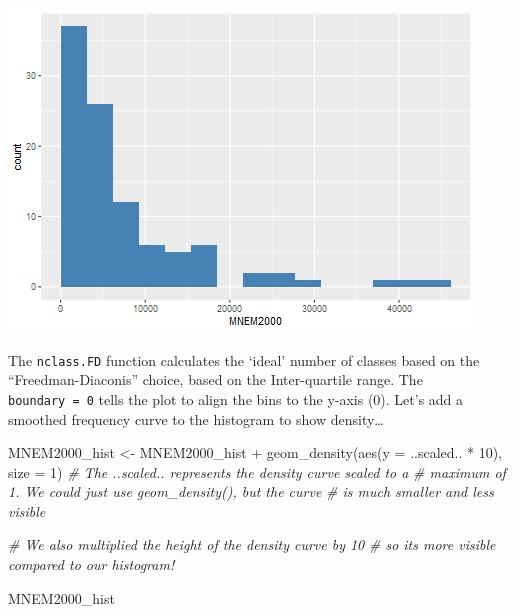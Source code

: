 \documentclass[
]{article}
\newenvironment{Shaded}{\begin{snugshade}}{\end{snugshade}}
\newcommand{\AttributeTok}[1]{\textcolor[rgb]{0.77,0.63,0.00}{#1}}
\newcommand{\CommentTok}[1]{\textcolor[rgb]{0.56,0.35,0.01}{\textit{#1}}}
\newcommand{\DecValTok}[1]{\textcolor[rgb]{0.00,0.00,0.81}{#1}}
\newcommand{\FunctionTok}[1]{\textcolor[rgb]{0.00,0.00,0.00}{#1}}
\newcommand{\NormalTok}[1]{#1}
\newcommand{\OtherTok}[1]{\textcolor[rgb]{0.56,0.35,0.01}{#1}}
\newcommand{\SpecialCharTok}[1]{\textcolor[rgb]{0.00,0.00,0.00}{#1}}
\newcommand{\StringTok}[1]{\textcolor[rgb]{0.31,0.60,0.02}{#1}}
\begin{document}
\begin{Shaded}
\end{Shaded}

\includegraphics{R-module-4-md_files/figure-latex/gghist-1.png}

The \texttt{nclass.FD} function calculates the `ideal' number of classes
based on the ``Freedman-Diaconis'' choice, based on the Inter-quartile
range. The \texttt{boundary\ =\ 0} tells the plot to align the bins to
the y-axis (0). Let's add a smoothed frequency curve to the histogram to
show density\ldots{}

\begin{Shaded}
\begin{Highlighting}[]
\NormalTok{MNEM2000\_hist }\OtherTok{\textless{}{-}}\NormalTok{ MNEM2000\_hist }\SpecialCharTok{+} 
  \FunctionTok{geom\_density}\NormalTok{(}\FunctionTok{aes}\NormalTok{(}\AttributeTok{y =}\NormalTok{ ..scaled.. }\SpecialCharTok{*} \DecValTok{10}\NormalTok{),}
               \AttributeTok{size =} \DecValTok{1}\NormalTok{)}
\CommentTok{\# The ..scaled.. represents the density curve scaled to a}
\CommentTok{\# maximum of 1. We could just use geom\_density(), but the curve}
\CommentTok{\# is much smaller and less visible}

\CommentTok{\# We also multiplied the height of the density curve by 10}
\CommentTok{\# so it\textquotesingle{}s more visible compared to our histogram!}

\NormalTok{MNEM2000\_hist}
\end{Highlighting}
\end{Shaded}
\end{document}
